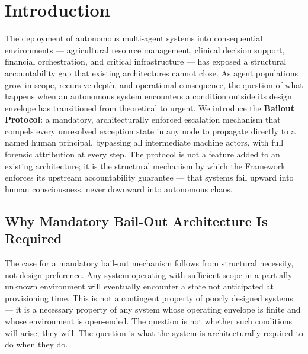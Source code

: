 \section{Introduction}
\label{sec:introduction}

The deployment of autonomous multi-agent systems into consequential environments — agricultural resource management, clinical decision support, financial orchestration, and critical infrastructure — has exposed a structural accountability gap that existing architectures cannot close. As agent populations grow in scope, recursive depth, and operational consequence, the question of what happens when an autonomous system encounters a condition outside its design envelope has transitioned from theoretical to urgent. We introduce the \textbf{Bailout Protocol}: a mandatory, architecturally enforced escalation mechanism that compels every unresolved exception state in any \bxthree node to propagate directly to a named human principal, bypassing all intermediate machine actors, with full forensic attribution at every step. The protocol is not a feature added to an existing architecture; it is the structural mechanism by which the \bxthree Framework enforces its upstream accountability guarantee — that \bxthree systems fail upward into human consciousness, never downward into autonomous chaos.

\subsection{Why Mandatory Bail-Out Architecture Is Required}
\label{sec:why-mandatory}

The case for a mandatory bail-out mechanism follows from structural necessity, not design preference. Any system operating with sufficient scope in a partially unknown environment will eventually encounter a state not anticipated at provisioning time. This is not a contingent property of poorly designed systems — it is a necessary property of any system whose operating envelope is finite and whose environment is open-ended. The question is not whether such conditions will arise; they will. The question is what the system is architecturally required to do when they do.

